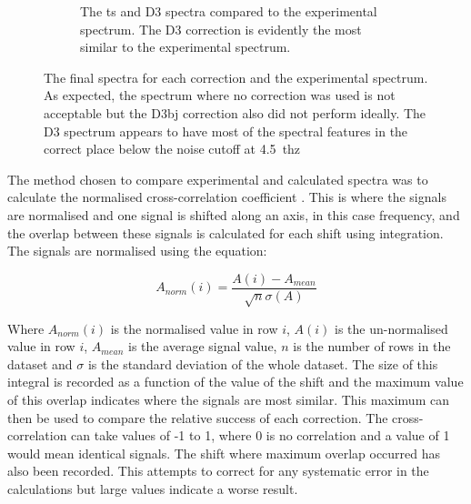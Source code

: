 \begin{figure}
\begin{subfigure}{1\textwidth}
    \caption{The \acrshort{ts} and D3 spectra compared to the experimental spectrum. The D3 correction is evidently the most similar to the experimental spectrum.}
    \label{fig:exp_d3_ts}
\end{subfigure}
\captionsetup{font = footnotesize, justification = centering}
\caption[The Calculated Terahertz Absorption Spectra for each Dispersion Correction and the Experimental Spectrum]{The final spectra for each correction and the experimental spectrum. As expected, the spectrum where no correction was used is not acceptable but the D3\acrshort{bj} correction also did not perform ideally. The D3 spectrum appears to have most of the spectral features in the correct place below the noise cutoff at \SI{4.5}{\acrshort{thz}}}
\label{fig:vdw_results}
\end{figure}

The method chosen to compare experimental and calculated spectra was to calculate the normalised cross\nobreakdash-correlation coefficient \cite{Kendrick2020}. This is where the signals are normalised and one signal is shifted along an axis, in this case frequency, and the overlap between these signals is calculated for each shift using integration. The signals are normalised using the equation:

\begin{equation}
A_{norm}(i) = \frac{A(i) - A_{mean}}{\sqrt{n}\sigma(A)}
\end{equation}

Where \(A_{norm}(i)\) is the normalised value in row \(i\), \(A(i)\) is the un\nobreakdash-normalised value in row \(i\), \(A_{mean}\) is the average signal value, \(n\) is the number of rows in the dataset and \(\sigma\) is the standard deviation of the whole dataset. The size of this integral is recorded as a function of the value of the shift and the maximum value of this overlap indicates where the signals are most similar. This maximum can then be used to compare the relative success of each correction. The cross\nobreakdash-correlation can take values of -1 to 1, where 0 is no correlation and a value of 1 would mean identical signals. The shift where maximum overlap occurred has also been recorded. This attempts to correct for any systematic error in the calculations but large values indicate a worse result.

